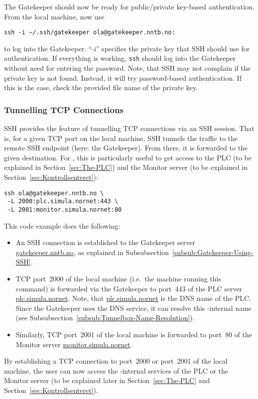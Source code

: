 The Gatekeeper should now be ready for public/private key-based authentication. From the local machine, now use
\begin{lstlisting}
ssh -i ~/.ssh/gatekeeper ola@gatekeeper.nntb.no:
\end{lstlisting}
to log into the Gatekeeper. ``-i'' specifies the private key that SSH should use for authentication. If everything is working, \texttt{ssh} should log into the Gatekeeper without need for entering the password. Note, that SSH may not complain if the private key is not found. Instead, it will try password-based authentication. If this is the case, check the provided file name of the private key.


\subsubsection{Tunnelling TCP Connections}
\label{subsub:Tunnelling-TCP-Connections}

SSH provides the feature of tunnelling TCP connections via an SSH session. That is, for a given TCP port on the local machine, SSH tunnels the traffic to the remote SSH endpoint (here: the Gatekeeper). From there, it is forwarded to the given destination.  For , this is particularly useful to get access to the PLC (to be explained in Section~\ref{sec:The-PLC}) and the Monitor server (to be explained in Section~\ref{sec:Kontrollsenteret}):
\begin{lstlisting}
ssh ola@gatekeeper.nntb.no \
 -L 2000:plc.simula.nornet:443 \
 -L 2001:monitor.simula.nornet:80
\end{lstlisting}
This code example does the following:
\begin{itemize}
 \item An SSH connection is established to the Gatekeeper server \href{ssh://gatekeeper.nntb.no}{gatekeeper.nntb.no}, as explained in Subsubsection~\ref{subsub:Gatekeeper-Using-SSH}.
 
 \item TCP port~2000 of the local machine (i.e.\ the machine running this command) is forwarded via the Gatekeeper to port~443 of the PLC server \href{https://plc.simula.nornet}{plc.simula.nornet}. Note, that \href{https://plc.simula.nornet}{plc.simula.nornet} is the DNS name of the PLC. Since the Gatekeeper uses the  DNS service, it can resolve this -internal name (see Subsubsection~\ref{subsub:Tunnelbox-Name-Resolution}).
 
 \item Similarly, TCP port~2001 of the local machine is forwarded to port~80 of the Monitor server \href{http://monitor.simula.nornet}{monitor.simula.nornet}\index{monitor.simula.nornet}.
\end{itemize}
By establishing a TCP connection to port~2000 or port~2001 of the local machine, the user can now access the \noun{NorNet}-internal services of the PLC or the Monitor server (to be explained later in Section~\ref{sec:The-PLC} and Section~\ref{sec:Kontrollsenteret}).

